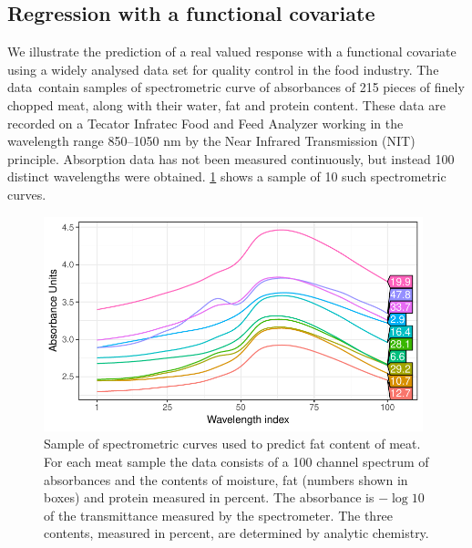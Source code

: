 \documentclass[showframe,11pt,twoside,openright]{report}\usepackage[]{graphicx}\usepackage{xcolor}
\makeatletter
\newenvironment{kframe}{%
 \def\at@end@of@kframe{}%
 \ifinner\ifhmode%
  \def\at@end@of@kframe{\end{minipage}}%
  \begin{minipage}{\columnwidth}%
 \fi\fi%
 \def\FrameCommand##1{\hskip\@totalleftmargin \hskip-\fboxsep
 \colorbox{shadecolor}{##1}\hskip-\fboxsep
     \hskip-\linewidth \hskip-\@totalleftmargin \hskip\columnwidth}%
 \MakeFramed {\advance\hsize-\width
   \@totalleftmargin\z@ \linewidth\hsize
   \@setminipage}}%
 {\par\unskip\endMakeFramed%
 \at@end@of@kframe}
\newenvironment{knitrout}{}{} %
\makeatother
\begin{document}
\subsection{Regression with a functional covariate}

We illustrate the prediction of a real valued response with a functional covariate using a widely analysed data set for quality control in the food industry.
The data\footnotemark~contain samples of spectrometric curve of absorbances of 215 pieces of finely chopped meat, along with their water, fat and protein content.
These data are recorded on a Tecator Infratec Food and Feed Analyzer working in the wavelength range 850--1050 nm by the Near Infrared Transmission (NIT) principle.
Absorption data has not been measured continuously, but instead 100 distinct wavelengths were obtained. \cref{fig:tecator.data} shows a sample of 10 such spectrometric curves.


\begin{knitrout}
\color{fgcolor}\begin{kframe}
\singlespacing\end{kframe}\begin{figure}[htb]

{\centering \includegraphics[width=11cm]{figure/04-tecator_data-1} 

}

\caption[Sample of spectrometric curves used to predict fat content of meat]{Sample of spectrometric curves used to predict fat content of meat. For each meat sample the data consists of a 100 channel spectrum of absorbances and the contents of moisture, fat (numbers shown in boxes) and protein measured in percent. The absorbance is $-\log 10$ of the transmittance measured by the spectrometer. The three contents, measured in percent, are determined by analytic chemistry.}\label{fig:tecator.data}
\end{figure}


\end{knitrout}
\end{document}
